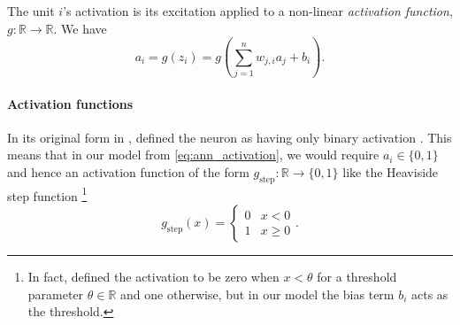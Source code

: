 \documentclass[../report.tex]{subfiles}
\begin{document}
The unit $i$'s activation is its excitation applied to a non-linear \emph{activation function}, $g: \mathbb{R} \rightarrow \mathbb{R}$. We have
\begin{equation}
    \label{eq:ann_activation}
    a_i = g\left(z_i\right) = g\left(\sum_{j=1}^n{w_{j,i} a_j} + b_i\right).
\end{equation}

\paragraph{Activation functions}
In its original form in \citeyear{mcculloch1943}, \citeauthor{mcculloch1943} defined the neuron as having only binary activation \cite*{mcculloch1943}. 
This means that in our model from \cref{eq:ann_activation}, we would require $a_i \in \{0, 1\}$ and hence an activation function of the form $g_\text{step}: \mathbb{R} \rightarrow \{0, 1\}$ like the Heaviside step function%
\footnote{In fact, \citeauthor{mcculloch1943} defined the activation to be zero when $x<\theta$ for a threshold parameter $\theta \in \mathbb{R}$ and one otherwise, but in our model the bias term $b_i$ acts as the threshold.}
\begin{equation*}
    \label{eq:step_activation}
    g_\text{step}(x) = \begin{cases} 
        0 & x < 0 \\
        1 & x \geq 0
    \end{cases}.
\end{equation*}
\end{document}
